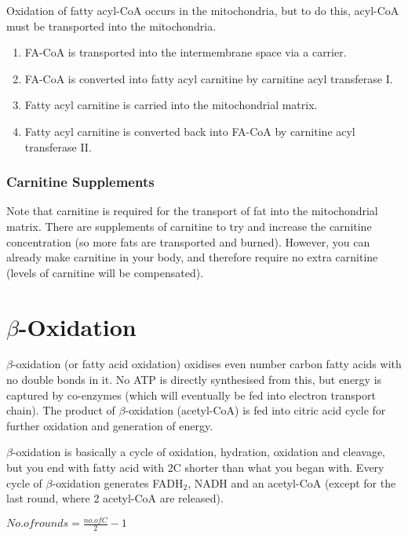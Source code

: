 \begin{center}
\end{center}

Oxidation of fatty acyl-CoA occurs in the mitochondria, but to do this, acyl-CoA must be transported into the mitochondria.
\begin{enumerate}
\item FA-CoA is transported into the intermembrane space via a carrier.
\item FA-CoA is converted into fatty acyl carnitine by carnitine acyl transferase I.
\item Fatty acyl carnitine is carried into the mitochondrial matrix.
\item Fatty acyl carnitine is converted back into FA-CoA by carnitine acyl transferase II.
\end{enumerate}

\subsubsection{Carnitine Supplements}

Note that carnitine is required for the transport of fat into the mitochondrial matrix.
There are supplements of carnitine to try and increase the carnitine concentration (so more fats are transported and burned).
However, you can already make carnitine in your body, and therefore require no extra carnitine (levels of carnitine will be compensated).

\section{$\beta$-Oxidation}

\begin{center}
\end{center}

$\beta$-oxidation (or fatty acid oxidation) oxidises even number carbon fatty acids with no double bonds in it.
No ATP is directly synthesised from this, but energy is captured by co-enzymes (which will eventually be fed into electron transport chain).
The product of $\beta$-oxidation (acetyl-CoA) is fed into citric acid cycle for further oxidation and generation of energy.

$\beta$-oxidation is basically a cycle of oxidation, hydration, oxidation and cleavage, but you end with fatty acid with 2C shorter than what you began with.
Every cycle of $\beta$-oxidation generates FADH$_2$, NADH and an acetyl-CoA (except for the last round, where 2 acetyl-CoA are released).

\begin{center}
$No. of rounds = \frac{no.of C}{2}-1$
\end{center}

